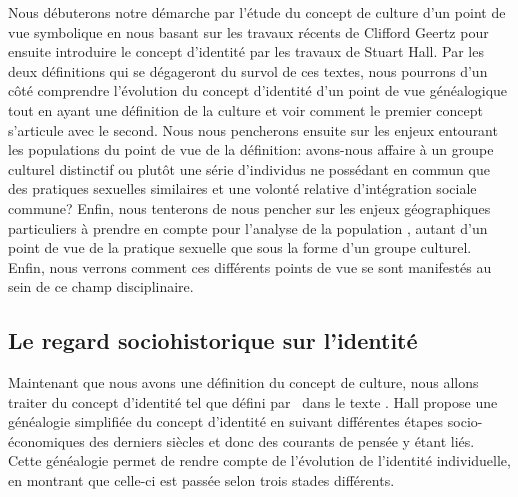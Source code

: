Nous débuterons notre démarche par l'étude du concept de culture d'un point de vue symbolique en nous basant sur les travaux récents de Clifford Geertz pour ensuite introduire le concept d'identité par les travaux de Stuart Hall. 
Par les deux définitions qui se dégageront du survol de ces textes, nous pourrons d'un côté comprendre l'évolution du concept d'identité d'un point de vue généalogique tout en ayant une définition de la culture et voir comment le premier concept s'articule avec le second. 
Nous nous pencherons ensuite sur les enjeux entourant les populations \lgbt{} du point de vue de la définition: avons-nous affaire à un groupe culturel distinctif ou plutôt une série d'individus ne possédant en commun que des pratiques sexuelles similaires et une volonté relative d'intégration sociale commune? 
Enfin, nous tenterons de nous pencher sur les enjeux géographiques particuliers à prendre en compte pour l'analyse de la population \lgbt{}, autant d'un point de vue de la pratique sexuelle que sous la forme d'un groupe culturel. 
Enfin, nous verrons comment ces différents points de vue se sont manifestés au sein de ce champ disciplinaire.


\subsection{Le regard sociohistorique sur l'identité}
\label{sec:le_regard_sociohistoirique_sur_l_identit_} Maintenant que nous avons une définition du concept de culture, nous allons traiter du concept d'identité tel que défini par~\citet{Hall1996a} dans le texte . 
Hall propose une généalogie simplifiée du concept d'identité en suivant différentes étapes socio-économiques des derniers siècles et donc des courants de pensée y étant liés. 
Cette généalogie permet de rendre compte de l'évolution de l'identité individuelle, en montrant que celle-ci est passée selon trois stades différents.

